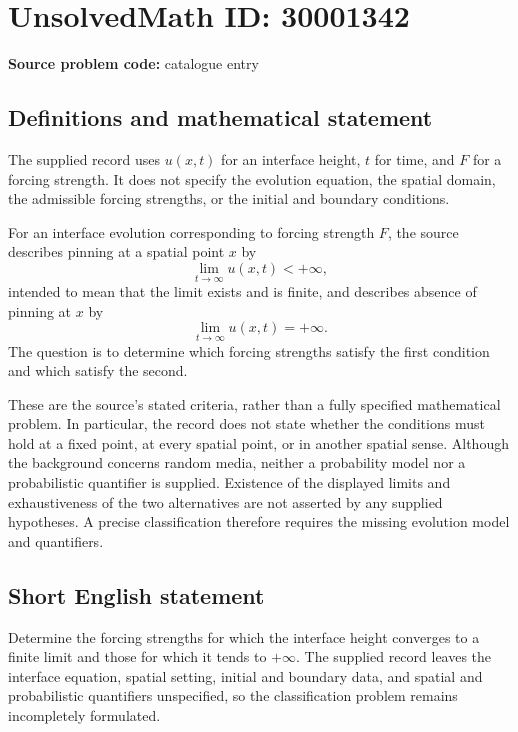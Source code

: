 \documentclass[11pt]{article}
\begin{document}
\section*{UnsolvedMath ID: 30001342}
\textbf{Source problem code:} catalogue entry
\subsection{Definitions and mathematical statement}
The supplied record uses \(u(x,t)\) for an interface height, \(t\) for time, and \(F\) for a forcing strength. It does not specify the evolution equation, the spatial domain, the admissible forcing strengths, or the initial and boundary conditions.

For an interface evolution corresponding to forcing strength \(F\), the source describes pinning at a spatial point \(x\) by
\[
\lim_{t\to\infty}u(x,t)<+\infty,
\]
intended to mean that the limit exists and is finite, and describes absence of pinning at \(x\) by
\[
\lim_{t\to\infty}u(x,t)=+\infty.
\]
The question is to determine which forcing strengths satisfy the first condition and which satisfy the second.

These are the source's stated criteria, rather than a fully specified mathematical problem. In particular, the record does not state whether the conditions must hold at a fixed point, at every spatial point, or in another spatial sense. Although the background concerns random media, neither a probability model nor a probabilistic quantifier is supplied. Existence of the displayed limits and exhaustiveness of the two alternatives are not asserted by any supplied hypotheses. A precise classification therefore requires the missing evolution model and quantifiers.
\subsection{Short English statement}
Determine the forcing strengths for which the interface height converges to a finite limit and those for which it tends to \(+\infty\). The supplied record leaves the interface equation, spatial setting, initial and boundary data, and spatial and probabilistic quantifiers unspecified, so the classification problem remains incompletely formulated.
\end{document}
